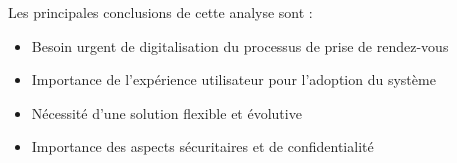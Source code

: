 Les principales conclusions de cette analyse sont :
\begin{itemize}
    \item Besoin urgent de digitalisation du processus de prise de rendez-vous
    \item Importance de l'expérience utilisateur pour l'adoption du système
    \item Nécessité d'une solution flexible et évolutive
    \item Importance des aspects sécuritaires et de confidentialité
\end{itemize}
